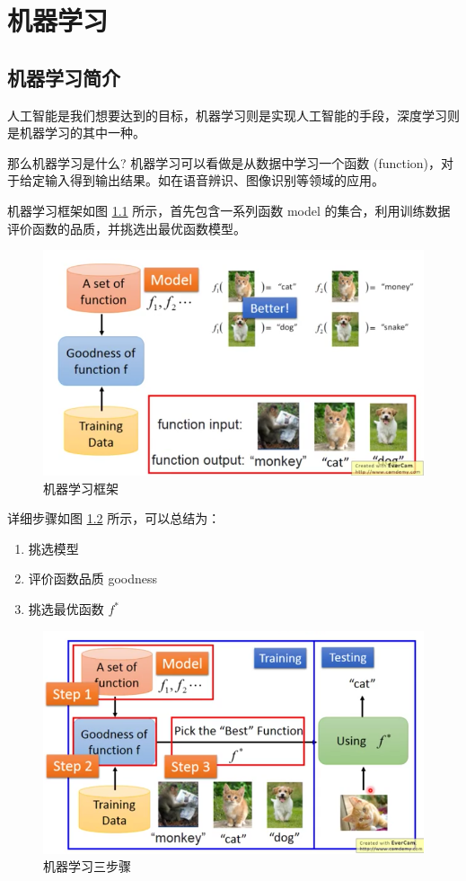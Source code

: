 \documentclass[UTF8]{ctexbook}
\begin{document}
	\chapter{机器学习}
	\section{机器学习简介}
人工智能是我们想要达到的目标，机器学习则是实现人工智能的手段，深度学习则是机器学习的其中一种。

那么机器学习是什么? 机器学习可以看做是从数据中学习一个函数 (function)，对于给定输入得到输出结果。如在语音辨识、图像识别等领域的应用。

机器学习框架如图 \ref{fig:ml_framework} 所示，首先包含一系列函数 model 的集合，利用训练数据评价函数的品质，并挑选出最优函数模型。

\begin{figure}[ht]
	\centering
	\includegraphics[scale=0.4]{./pic/ml_framework.png}
	\caption{机器学习框架}
	\label{fig:ml_framework}
\end{figure}
  
详细步骤如图 \ref{fig:three_step} 所示，可以总结为：

\begin{enumerate}
	\item 挑选模型
	\item 评价函数品质 goodness
	\item 挑选最优函数 $f^*$
\end{enumerate}
	
\begin{figure}[ht]
	\centering
	\includegraphics[scale=0.4]{./pic/three_step_of_ml.png}
	\caption{机器学习三步骤}
	\label{fig:three_step}
\end{figure}
\end{document}
